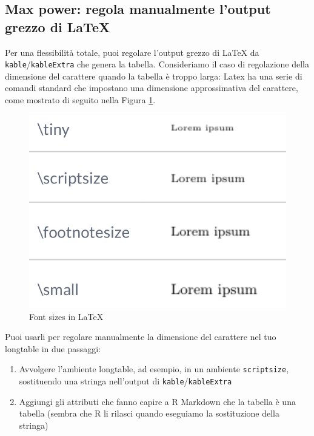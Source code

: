 \documentclass[a4paper, 11pt, nobind]{templates/ociamthesis}
\providecommand{\tightlist}{%
  \setlength{\itemsep}{0pt}\setlength{\parskip}{0pt}}
\begin{document}
\hypertarget{max-power}{%
\subsection{Max power: regola manualmente l'output grezzo di LaTeX}\label{max-power}}

Per una flessibilità totale, puoi regolare l'output grezzo di LaTeX da \texttt{kable}/\texttt{kableExtra} che genera la tabella.
Consideriamo il caso di regolazione della dimensione del carattere quando la tabella è troppo larga:
Latex ha una serie di comandi standard che impostano una dimensione approssimativa del carattere, come mostrato di seguito nella Figura \ref{fig:latex-font-sizing}.

\begin{figure}[H]

{\centering \includegraphics[width=0.5\linewidth]{figures/sample-content/latex_font_sizes} 

}

\caption{Font sizes in LaTeX}\label{fig:latex-font-sizing}
\end{figure}

Puoi usarli per regolare manualmente la dimensione del carattere nel tuo longtable in due passaggi:

\begin{enumerate}
\def\labelenumi{\arabic{enumi}.}
\tightlist
\item
  Avvolgere l'ambiente longtable, ad esempio, in un ambiente \texttt{scriptsize}, sostituendo una stringa nell'output di \texttt{kable}/\texttt{kableExtra}
\item
  Aggiungi gli attributi che fanno capire a R Markdown che la tabella è una tabella (sembra che R li rilasci quando eseguiamo la sostituzione della stringa)
\end{enumerate}
\end{document}
